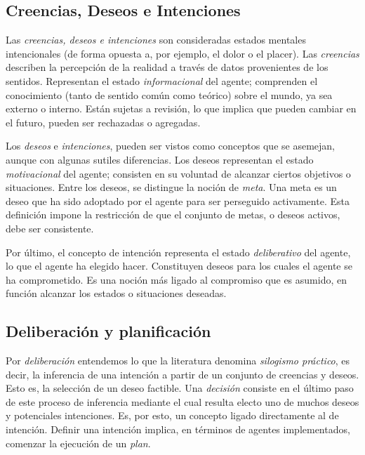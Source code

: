 \subsection{Creencias, Deseos e Intenciones}
\label{sub:creencia_deseos_intenciones}
 
 Las \textit{creencias, deseos e intenciones} son consideradas estados
 mentales  intencionales (de forma opuesta a, por ejemplo, el dolor o
 el placer).
 Las \textit{creencias}  describen la percepción de la realidad a
 través de datos provenientes de  los sentidos.
 Representan el estado \textit{informacional} del agente; comprenden el
 conocimiento (tanto de sentido común como teórico) sobre el mundo, ya
 sea  externo o interno.
 Están sujetas a revisión, lo que implica que pueden  cambiar en el
 futuro, pueden ser rechazadas o agregadas.
 
 Los \textit{deseos} e \textit{intenciones}, pueden ser vistos como
 conceptos que  se asemejan, aunque con algunas sutiles diferencias.
 Los deseos representan el  estado \textit{motivacional} del agente;
 consisten en su voluntad de alcanzar  ciertos objetivos o situaciones.
 Entre los deseos, se distingue la noción de  \textit{meta}.
 Una meta es un deseo que ha sido adoptado por el agente para  ser
 perseguido activamente.
 Esta definición impone la restricción de que el  conjunto de metas, o
 deseos activos, debe ser consistente.
 
 Por último, el concepto de intención representa el estado
 \textit{deliberativo} del agente, lo que el agente ha elegido hacer.
 Constituyen deseos para los cuales el agente se ha comprometido.
 Es una noción más ligado al compromiso que es  asumido, en función
 alcanzar los estados o situaciones deseadas.

\subsection{Deliberación y planificación}
\label{sub:deliberacion_planificacion}
 
 Por \textit{deliberación} entendemos lo que la literatura denomina
 \textit{silogismo práctico}, es decir, la inferencia de una intención
 a partir de un conjunto de creencias y deseos.
 Esto es, la selección de un deseo factible.
 Una \textit{decisión}  consiste en el último paso de este proceso de
 inferencia mediante el cual  resulta electo uno de muchos deseos y
 potenciales intenciones.
 Es, por esto, un concepto ligado directamente al de intención.
 Definir una intención implica, en  términos de agentes implementados,
 comenzar la ejecución de un \textit{plan}.
 
